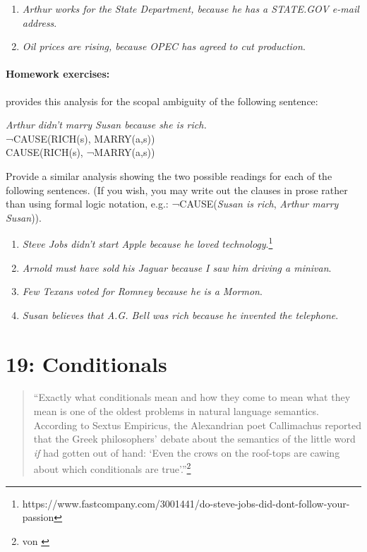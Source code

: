 \begin{enumerate}
\item 
\textit{Arthur works for the State Department, because he has a STATE.GOV e-mail address}.
\item 
\textit{Oil prices are rising, because OPEC has agreed to cut production}.
\end{enumerate}
\subsubsection{Homework exercises:}\label{sec:}

 provides this analysis for the scopal ambiguity of the following sentence:

\ea
  \textit{Arthur didn’t marry Susan because she is rich.}\\
\ea ¬CAUSE(RICH(s), MARRY(a,s))\\
\ex CAUSE(RICH(s), ¬MARRY(a,s))
\z \z

Provide a similar analysis showing the two possible readings for each of the following sentences. (If you wish, you may write out the clauses in prose rather than using formal logic notation, e.g.: ¬CAUSE(\textit{Susan is rich}, \textit{Arthur marry Susan})).

\begin{enumerate}
\item \textit{Steve Jobs didn’t start Apple because he loved technology}.\footnote{https://www.fastcompany.com/3001441/do-steve-jobs-did-dont-follow-your-passion}
\item \textit{Arnold must have sold his Jaguar because I saw him driving a minivan}.
\item \textit{Few Texans voted for Romney because he is a Mormon}.
\item \textit{Susan believes that A.G. Bell was rich because he invented the telephone}.
\end{enumerate}

\chapter{{19}: Conditionals}

\begin{quote}
“Exactly what conditionals mean and how they come to mean what they mean is one of the oldest problems in natural language semantics. According to Sextus Empiricus, the Alexandrian poet Callimachus reported that the Greek philosophers’ debate about the semantics of the little word \textit{if} had gotten out of hand: ‘Even the crows on the roof-tops are cawing about which conditionals are true’.”\footnote{von \citet{Fintel2011}}
\end{quote}

